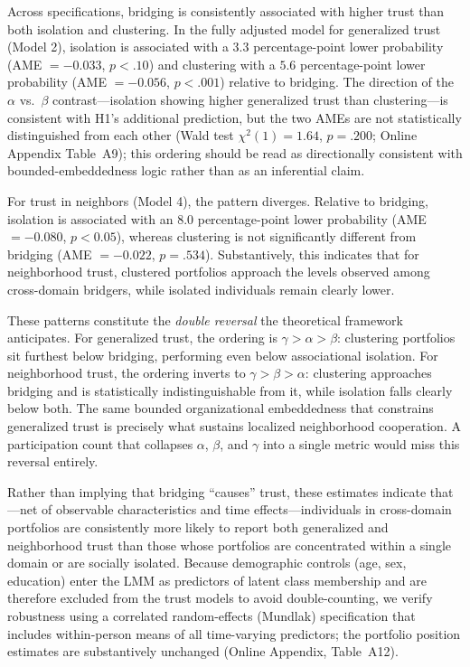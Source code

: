 Across specifications, bridging is consistently associated with higher trust than both isolation and clustering. In the fully adjusted model for generalized trust (Model 2), isolation is associated with a $3.3$ percentage-point lower probability (AME $=-0.033$, $p<.10$) and clustering with a $5.6$ percentage-point lower probability (AME $=-0.056$, $p<.001$) relative to bridging. The direction of the $\alpha$ vs.\ $\beta$ contrast---isolation showing higher generalized trust than clustering---is consistent with H1's additional prediction, but the two AMEs are not statistically distinguished from each other (Wald test $\chi^2(1) = 1.64$, $p = .200$; Online Appendix Table~A9); this ordering should be read as directionally consistent with bounded-embeddedness logic rather than as an inferential claim.

For trust in neighbors (Model 4), the pattern diverges. Relative to bridging, isolation is associated with an $8.0$ percentage-point lower probability (AME $=-0.080$, $p<0.05$), whereas clustering is not significantly different from bridging (AME $=-0.022$, $p=.534$). Substantively, this indicates that for neighborhood trust, clustered portfolios approach the levels observed among cross-domain bridgers, while isolated individuals remain clearly lower.

These patterns constitute the \textit{double reversal} the theoretical framework anticipates. For generalized trust, the ordering is $\gamma > \alpha > \beta$: clustering portfolios sit furthest below bridging, performing even below associational isolation. For neighborhood trust, the ordering inverts to $\gamma > \beta > \alpha$: clustering approaches bridging and is statistically indistinguishable from it, while isolation falls clearly below both. The same bounded organizational embeddedness that constrains generalized trust is precisely what sustains localized neighborhood cooperation. A participation count that collapses $\alpha$, $\beta$, and $\gamma$ into a single metric would miss this reversal entirely.

Rather than implying that bridging “causes” trust, these estimates indicate that---net of observable characteristics and time effects---individuals in cross-domain portfolios are consistently more likely to report both generalized and neighborhood trust than those whose portfolios are concentrated within a single domain or are socially isolated. Because demographic controls (age, sex, education) enter the LMM as predictors of latent class membership and are therefore excluded from the trust models to avoid double-counting, we verify robustness using a correlated random-effects (Mundlak) specification that includes within-person means of all time-varying predictors; the portfolio position estimates are substantively unchanged (Online Appendix, Table~A12).


